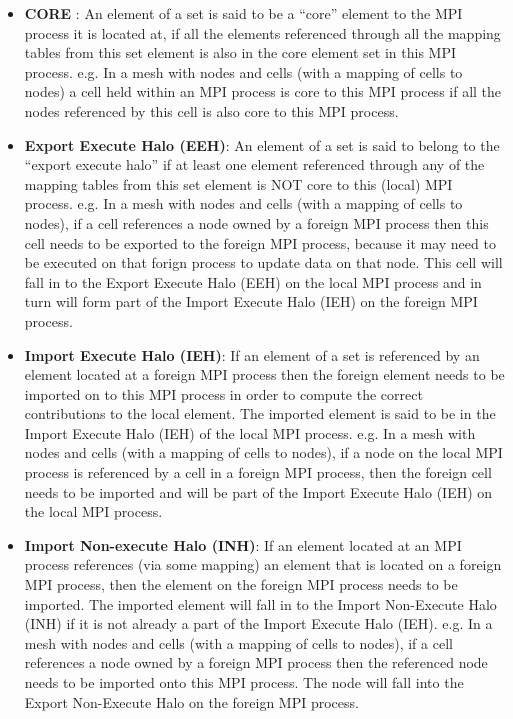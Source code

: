 \documentclass[11pt]{article}
\begin{document}
\begin{itemize}
\item \textbf{CORE} : An element of a set is said to be a ``core'' element to the MPI process it is located at, if
all the elements referenced through all the mapping tables from this set element is also in the core element set in this
MPI process. e.g. In a mesh with nodes and cells (with a mapping of cells to nodes) a cell held within an MPI process is
core to this MPI process if all the nodes referenced by this cell is also core to this MPI process.

\item \textbf{Export Execute Halo (EEH)}: An element of a set is said to belong to the ``export execute halo'' if at
least one element referenced through any of the mapping tables from this set element is NOT core to this (local) MPI
process. e.g. In a mesh with nodes and cells (with a mapping of cells to nodes), if a cell references a node owned by a
foreign MPI process then this cell needs to be exported to the foreign MPI process, because it may need to be executed
on that forign process to update data on that node. This cell will fall in to the Export Execute Halo (EEH) on the local
MPI process and in turn will form part of the Import Execute Halo (IEH) on the foreign MPI process.

\item \textbf{Import Execute Halo (IEH)}: If an element of a set is referenced by an element located at a foreign MPI
process then the foreign element needs to be imported on to this MPI process in order to compute the correct
contributions to the local element. The imported element is said to be in the Import Execute Halo (IEH) of the local MPI
process. e.g. In a mesh with nodes and cells (with a mapping of cells to nodes), if a node on the local MPI process is
referenced by a cell in a foreign MPI process, then the foreign cell needs to be imported and will be part of the Import
Execute Halo (IEH) on the local MPI process.

\item \textbf{Import Non-execute Halo (INH)}: If an element located at an MPI process references (via some mapping) an
element that is located on a foreign MPI process, then the element on the foreign MPI process needs to be imported. The
imported element will fall in to the Import Non-Execute Halo (INH) if it is not already a part of the Import Execute
Halo (IEH). e.g. In a mesh with nodes and cells (with a mapping of cells to nodes), if a cell references a node owned by
a foreign MPI process then the referenced node needs to be imported onto this MPI process. The node will fall into the
Export Non-Execute Halo on the foreign MPI process.


\end{itemize}
\end{document}
